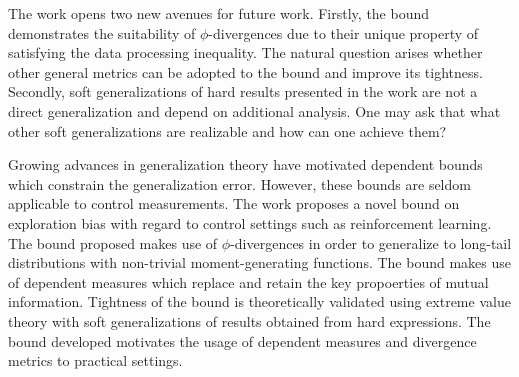 \documentclass[11pt,letterpaper]{article}
\begin{document}
The work opens two new avenues for future work. Firstly, the bound demonstrates the suitability of $\phi$-divergences due to their unique property of satisfying the data processing inequality. The natural question arises whether other general metrics can be adopted to the bound and improve its tightness. Secondly, soft generalizations of hard results presented in the work are not a direct generalization and depend on additional analysis. One may ask that what other soft generalizations are realizable and how can one achieve them?

Growing advances in generalization theory have motivated dependent bounds which constrain the generalization error. However, these bounds are seldom applicable to control measurements. The work proposes a novel bound on exploration bias with regard to control settings such as reinforcement learning. The bound proposed makes use of $\phi$-divergences in order to generalize to long-tail distributions with non-trivial moment-generating functions. The bound makes use of dependent measures which replace and retain the key propoerties of mutual information. Tightness of the bound is theoretically validated using extreme value theory with soft generalizations of results obtained from hard expressions. The bound developed motivates the usage of dependent measures and divergence metrics to practical settings.
\end{document}
